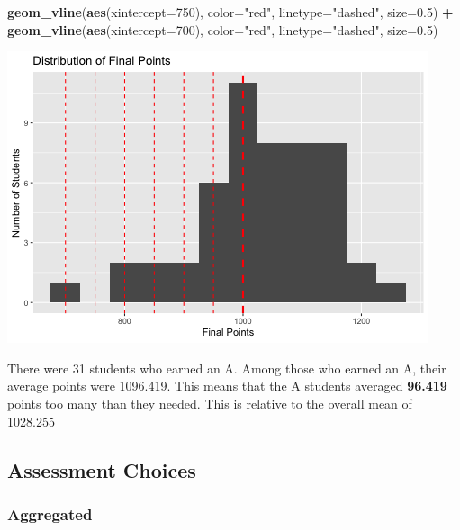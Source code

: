 \documentclass[]{article}
\newenvironment{Shaded}{\begin{snugshade}}{\end{snugshade}}
\newcommand{\KeywordTok}[1]{\textcolor[rgb]{0.13,0.29,0.53}{\textbf{#1}}}
\newcommand{\DataTypeTok}[1]{\textcolor[rgb]{0.13,0.29,0.53}{#1}}
\newcommand{\DecValTok}[1]{\textcolor[rgb]{0.00,0.00,0.81}{#1}}
\newcommand{\FloatTok}[1]{\textcolor[rgb]{0.00,0.00,0.81}{#1}}
\newcommand{\StringTok}[1]{\textcolor[rgb]{0.31,0.60,0.02}{#1}}
\newcommand{\OperatorTok}[1]{\textcolor[rgb]{0.81,0.36,0.00}{\textbf{#1}}}
\newcommand{\NormalTok}[1]{#1}
\begin{document}
\begin{Shaded}
\begin{Highlighting}[]
\StringTok{  }\KeywordTok{geom_vline}\NormalTok{(}\KeywordTok{aes}\NormalTok{(}\DataTypeTok{xintercept=}\DecValTok{750}\NormalTok{), }\DataTypeTok{color=}\StringTok{"red"}\NormalTok{, }\DataTypeTok{linetype=}\StringTok{"dashed"}\NormalTok{, }\DataTypeTok{size=}\FloatTok{0.5}\NormalTok{) }\OperatorTok{+}
\StringTok{  }\KeywordTok{geom_vline}\NormalTok{(}\KeywordTok{aes}\NormalTok{(}\DataTypeTok{xintercept=}\DecValTok{700}\NormalTok{), }\DataTypeTok{color=}\StringTok{"red"}\NormalTok{, }\DataTypeTok{linetype=}\StringTok{"dashed"}\NormalTok{, }\DataTypeTok{size=}\FloatTok{0.5}\NormalTok{) }
\end{Highlighting}
\end{Shaded}

\includegraphics{figures/points-distribution-1.png}

There were 31 students who earned an A. Among those who earned an A,
their average points were 1096.419. This means that the A students
averaged \textbf{96.419} points too many than they needed. This is
relative to the overall mean of 1028.255

\subsection{Assessment Choices}\label{assessment-choices}

\subsubsection{Aggregated}\label{aggregated}
\end{document}
